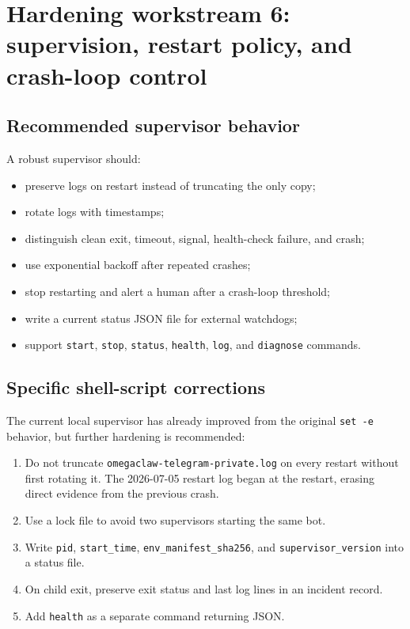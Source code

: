 \documentclass[11pt]{article}
\begin{document}
\section{Hardening workstream 6: supervision, restart policy, and crash-loop control}

\subsection{Recommended supervisor behavior}

A robust supervisor should:

\begin{itemize}
  \item preserve logs on restart instead of truncating the only copy;
  \item rotate logs with timestamps;
  \item distinguish clean exit, timeout, signal, health-check failure, and crash;
  \item use exponential backoff after repeated crashes;
  \item stop restarting and alert a human after a crash-loop threshold;
  \item write a current status JSON file for external watchdogs;
  \item support \texttt{start}, \texttt{stop}, \texttt{status}, \texttt{health}, \texttt{log}, and \texttt{diagnose} commands.
\end{itemize}

\subsection{Specific shell-script corrections}

The current local supervisor has already improved from the original \texttt{set -e} behavior, but further hardening is recommended:

\begin{enumerate}
  \item Do not truncate \texttt{omegaclaw-telegram-private.log} on every restart without first rotating it. The 2026-07-05 restart log began at the restart, erasing direct evidence from the previous crash.
  \item Use a lock file to avoid two supervisors starting the same bot.
  \item Write \texttt{pid}, \texttt{start\_time}, \texttt{env\_manifest\_sha256}, and \texttt{supervisor\_version} into a status file.
  \item On child exit, preserve exit status and last log lines in an incident record.
  \item Add \texttt{health} as a separate command returning JSON.
\end{enumerate}
\end{document}
